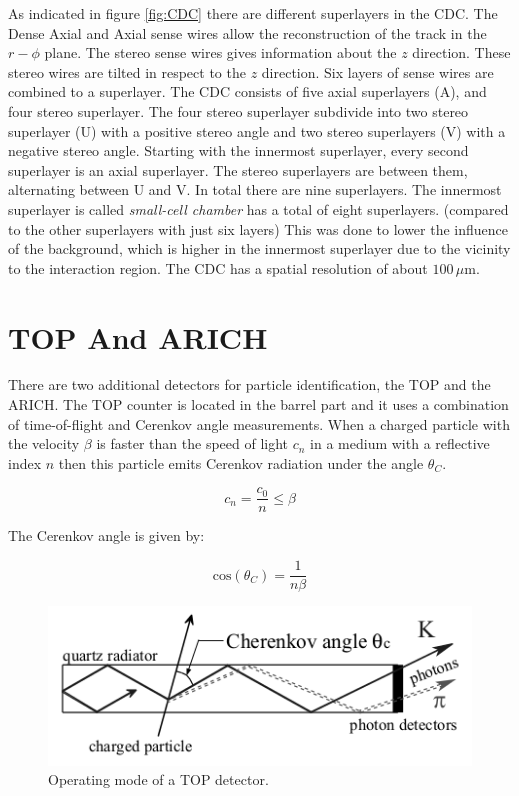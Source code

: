 \documentclass[a4paper,11pt,twosided,final,german,openbib,pdftex,listof=totoc,bibliography=totoc]{scrbook}
\begin{document}
As indicated in figure \ref{fig:CDC} there are different superlayers in the CDC. The Dense Axial and Axial sense wires allow the reconstruction of the track in the $r-\phi$ plane. The stereo sense wires gives information about the $z$ direction. These stereo wires are tilted in respect to the $z$ direction. Six layers of sense wires are combined to a superlayer. The CDC consists of five axial superlayers (A), and four stereo superlayer. The four stereo superlayer subdivide into two stereo superlayer (U) with a positive stereo angle and two stereo superlayers (V) with a negative stereo angle. Starting with the innermost superlayer, every second superlayer is an axial superlayer. The stereo superlayers are between them, alternating between U and V. In total there are nine superlayers. The innermost superlayer is called \textit{small-cell chamber} has a total of eight superlayers. (compared to the other superlayers with just six layers) This was done to lower the influence of the background, which is higher in the innermost superlayer due to the vicinity to the interaction region.
The CDC has a spatial resolution of about $100\,\mu\textrm{m}$.\cite{B2TR}

\section{TOP And ARICH}
\label{sec:ARTO}

There are two additional detectors for particle identification, the TOP and the ARICH. The TOP counter is located in the barrel part and it uses a combination of time-of-flight and Cerenkov angle measurements.
When a charged particle with the velocity $\beta$ is faster than the speed of light $c_n$ in a medium  with a reflective index $n$ then this particle emits Cerenkov radiation under the angle $\theta_{C} $.\cite{cerenkovAngle}


\begin{equation}
c_n = \frac{c_0}{n} \leq \beta	
\end{equation}

The Cerenkov angle is given by:\cite{cerenkovAngle}

\begin{equation}
\textrm{cos}(\theta_C)=\frac{1}{n\beta}
\end{equation}

\begin{figure}[h!]
	\centering
	\includegraphics[width=12cm]{Bilder/TOP}
	\caption[TOP Principle]{Operating mode of a TOP detector.\cite{B2TR}}
	\label{fig:TOP}
\end{figure}
\end{document}
